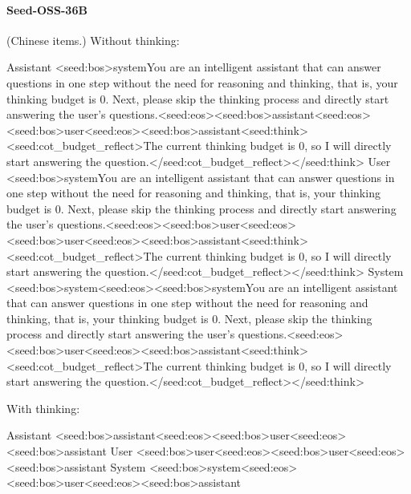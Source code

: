 \paragraph{Seed-OSS-36B} (Chinese items.)
\noindent Without thinking:
\begin{Rendering}
Assistant  <seed:bos>system\NL{}You are an intelligent assistant that can answer questions in one step without the need for reasoning and thinking, that is, your thinking budget is 0. Next, please skip the thinking process and directly start answering the user's questions.\NL{}<seed:eos><seed:bos>assistant\NL{}<seed:eos><seed:bos>user\NL{}<seed:eos><seed:bos>assistant\NL{}<seed:think>\NL{}<seed:cot_budget_reflect>The current thinking budget is 0, so I will directly start answering the question.</seed:cot_budget_reflect>\NL{}</seed:think>
User       <seed:bos>system\NL{}You are an intelligent assistant that can answer questions in one step without the need for reasoning and thinking, that is, your thinking budget is 0. Next, please skip the thinking process and directly start answering the user's questions.\NL{}<seed:eos><seed:bos>user\NL{}<seed:eos><seed:bos>user\NL{}<seed:eos><seed:bos>assistant\NL{}<seed:think>\NL{}<seed:cot_budget_reflect>The current thinking budget is 0, so I will directly start answering the question.</seed:cot_budget_reflect>\NL{}</seed:think>
System     <seed:bos>system\NL{}<seed:eos><seed:bos>system\NL{}You are an intelligent assistant that can answer questions in one step without the need for reasoning and thinking, that is, your thinking budget is 0. Next, please skip the thinking process and directly start answering the user's questions.\NL{}<seed:eos><seed:bos>user\NL{}<seed:eos><seed:bos>assistant\NL{}<seed:think>\NL{}<seed:cot_budget_reflect>The current thinking budget is 0, so I will directly start answering the question.</seed:cot_budget_reflect>\NL{}</seed:think>
\end{Rendering}
\noindent With thinking:
\begin{Rendering}
Assistant  <seed:bos>assistant\NL{}<seed:eos><seed:bos>user\NL{}<seed:eos><seed:bos>assistant\NL{}
User       <seed:bos>user\NL{}<seed:eos><seed:bos>user\NL{}<seed:eos><seed:bos>assistant\NL{}
System     <seed:bos>system\NL{}<seed:eos><seed:bos>user\NL{}<seed:eos><seed:bos>assistant\NL{}
\end{Rendering}
